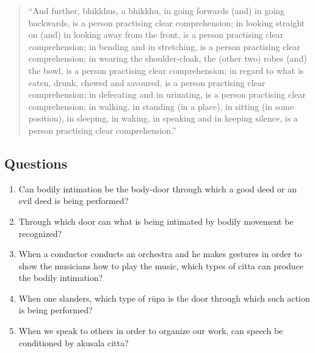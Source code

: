 \documentclass{book}
\begin{document}
\begin{quote}\begin{flushleft}
``And further, bhikkhus, a bhikkhu, in going forwards (and) in going
backwards, is a person practising clear comprehension; in looking
straight on (and) in looking away from the front, is a person
practising clear comprehension; in bending and in stretching, is a
person practising clear comprehension; in wearing the shoulder-cloak,
the (other two) robes (and) the bowl, is a person practising clear
comprehension; in regard to what is eaten, drunk, chewed and savoured,
is a person practising clear comprehension; in defecating and in
urinating, is a person practising clear comprehension; in walking, in
standing (in a place), in sitting (in some position), in sleeping, in
waking, in speaking and in keeping silence, is a person practising
clear comprehension.''
\end{flushleft}\end{quote}






\subsection*{Questions}

\begin{enumerate}
\item Can bodily intimation be the body-door through which a 
good deed or an evil deed is being performed?


\item Through which door can what is being intimated by bodily
movement be recognized?

\item When a conductor conducts an orchestra and he makes gestures
in order to show the musicians how to play the music, which
types of citta can produce the bodily intimation?

\item When one slanders, which type of r\=upa is the door through
which such action is being performed?

\item When we speak to others in order to organize our work, can
speech be conditioned by akusala citta?

\end{enumerate}
\end{document}
